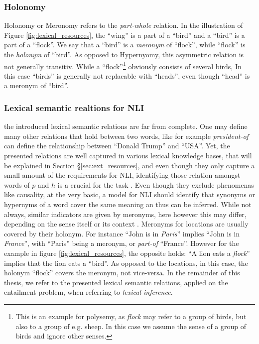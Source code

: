 \subsubsection{Holonomy}
Holonomy or Meronomy refers to the \textit{part-whole} relation. In the illustration of Figure \ref{fig:lexical_resources}, the ``wing'' is a part of a ``bird'' and a ``bird'' is a part of a ``flock''. We say that a ``bird'' is a \textit{meronym} of ``flock'', while ``flock'' is the \textit{holonym} of ``bird''. As opposed to Hypernyomy, this asymmetric relation is not generally transitiv. While a ``flock''\footnote{This is an example for polysemy, as \textit{flock} may refer to a group of birds, but also to a group of e.g. sheep. In this case we assume the sense of a group of birds and ignore other senses.} obviously consists of several birds, In this case ``birds'' is generally not replacable with ``heads'', even though ``head'' is a meronym of ``bird''. 
\subsubsection{Lexical semantic realtions for \ac{NLI}}
the introduced lexical semantic relations are far from complete. One may define many other relations that hold between two words, like for example \textit{president-of} can define the relationship between ``Donald Trump'' and ``USA''. Yet, the presented relations are well captured in various lexical knowledge bases, that will be explained in Section §\ref{sec:ext_resources}, and even though they only capture a small amount of the requirements for \ac{NLI}, identifying those relation amongst words of $p$ and $h$ is a crucial for the task \citep{shwartz2015learning}. Even though they exclude phenomenas like causality, at the very basic, a model for \ac{NLI} should identify that synonyms or hypernyms of a word cover the same meaning an thus can be inferred. While not always, similar indicators are given by meronyms, here however this may differ, depending on the sense itself or its context \citep{shwartz2015learning}. Meronyms for locations are usually covered by their holonym. For instance ``John is in \textit{Paris}'' implies ``John is in \textit{France}'', with ``Paris'' being a meronym, or \textit{part-of} ``France''. However for the example in figure \ref{fig:lexical_resources}, the opposite holds: ``A lion eats a \textit{flock}'' implies that the lion eats a ``bird''. As opposed to the locations, in this case, the holonym ``flock'' covers the meronym, not vice-versa. In the remainder of this thesis, we refer to the presented lexical semantic relations, applied on the entailment problem, when referring to \textit{lexical inference}.
